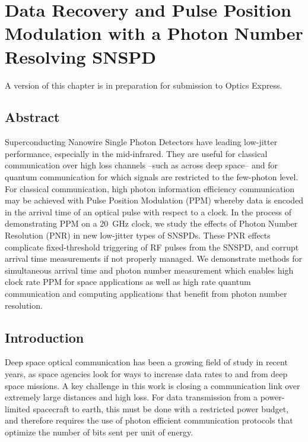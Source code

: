\documentclass[11pt]{caltech_thesis} %
\begin{document}
\hypertarget{data-recovery-and-pulse-position-modulation-with-a-photon-number-resolving-snspd}{%
\chapter{Data Recovery and Pulse Position Modulation with a Photon Number Resolving SNSPD}\label{data-recovery-and-pulse-position-modulation-with-a-photon-number-resolving-snspd}}

A version of this chapter is in preparation for submission to Optics Express.

\hypertarget{abstract-2}{%
\section{Abstract}\label{abstract-2}}

Superconducting Nanowire Single Photon Detectors have leading low-jitter performance, especially in the mid-infrared. They are useful for classical communication over high loss channels --such as across deep space-- and for quantum communication for which signals are restricted to the few-photon level. For classical communication, high photon information efficiency communication may be achieved with Pulse Position Modulation (PPM) whereby data is encoded in the arrival time of an optical pulse with respect to a clock. In the process of demonstrating PPM on a 20~GHz clock, we study the effects of Photon Number Resolution (PNR) in new low-jitter types of SNSPDs. These PNR effects complicate fixed-threshold triggering of RF pulses from the SNSPD, and corrupt arrival time measurements if not properly managed. We demonstrate methods for simultaneous arrival time and photon number measurement which enables high clock rate PPM for space applications as well as high rate quantum communication and computing applications that benefit from photon number resolution.

\hypertarget{introduction-3}{%
\section{Introduction}\label{introduction-3}}

Deep space optical communication has been a growing field of study in recent years, as space agencies look for ways to increase data rates to and from deep space missions. A key challenge in this work is closing a communication link over extremely large distances and high loss. For data transmission from a power-limited spacecraft to earth, this must be done with a restricted power budget, and therefore requires the use of photon efficient communication protocols that optimize the number of bits sent per unit of energy.
\end{document}
